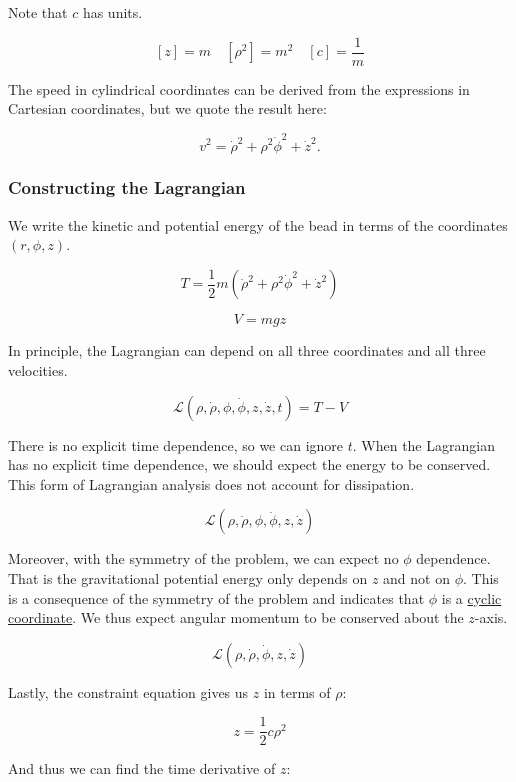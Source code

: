 \documentclass[11pt]{article}
\begin{document}
Note that \(c\) has units.

\[[z] = m \quad [\rho^2] = m^2 \quad [c] = \dfrac{1}{m}\]

The speed in cylindrical coordinates can be derived from the expressions
in Cartesian coordinates, but we quote the result here:

\[v^2 = \dot{\rho}^2 + \rho^2\dot{\phi}^2 + \dot{z}^2.\]

\subsubsection{Constructing the
Lagrangian}\label{constructing-the-lagrangian}

We write the kinetic and potential energy of the bead in terms of the
coordinates \((r, \phi, z)\).

\[T = \dfrac{1}{2}m\left(\dot{\rho}^2 + \rho^2\dot{\phi}^2 + \dot{z}^2\right)\]

\[V = mgz\]

In principle, the Lagrangian can depend on all three coordinates and all
three velocities.

\[\mathcal{L}(\rho, \dot{\rho}, \phi, \dot{\phi}, z, \dot{z}, t) = T - V\]

There is no explicit time dependence, so we can ignore \(t\). When the
Lagrangian has no explicit time dependence, we should expect the energy
to be conserved. This form of Lagrangian analysis does not account for
dissipation.

\[\mathcal{L}(\rho, \dot{\rho}, \phi, \dot{\phi}, z, \dot{z})\]

Moreover, with the symmetry of the problem, we can expect no \(\phi\)
dependence. That is the gravitational potential energy only depends on
\(z\) and not on \(\phi\). This is a consequence of the symmetry of the
problem and indicates that \(\phi\) is a
\href{https://phys.libretexts.org/Bookshelves/Classical_Mechanics/Variational_Principles_in_Classical_Mechanics_(Cline)/07\%3A_Symmetries_Invariance_and_the_Hamiltonian/7.05\%3A_Cyclic_Coordinates}{cyclic
coordinate}. We thus expect angular momentum to be conserved about the
\(z\)-axis.

\[\mathcal{L}(\rho, \dot{\rho}, \dot{\phi}, z, \dot{z})\]

Lastly, the constraint equation gives us \(z\) in terms of \(\rho\):

\[z = \dfrac{1}{2}c\rho^2\]

And thus we can find the time derivative of \(z\):
\end{document}
